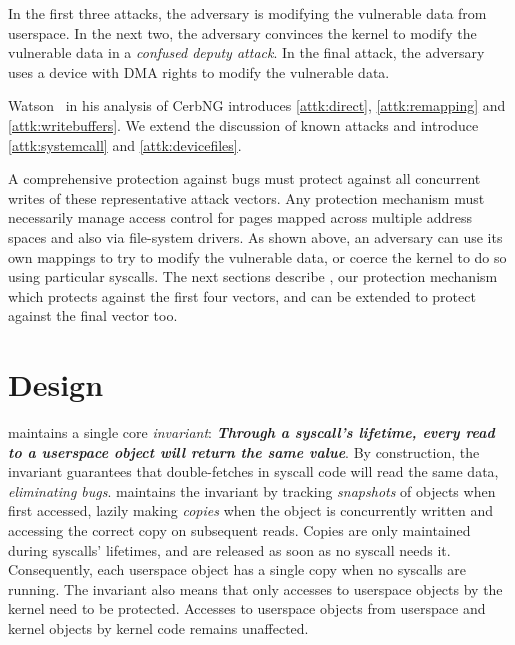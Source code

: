 \documentclass[letterpaper,twocolumn,10pt, anonymous]{article}
\begin{document}
In the first three attacks, the adversary is modifying the vulnerable data 
from userspace.
In the next two, the adversary convinces the kernel to modify the vulnerable
data in a \emph{confused deputy attack}.
In the final attack, the adversary uses a device with DMA rights to modify 
the vulnerable data.

Watson~\cite{watson2007exploiting} in his analysis of CerbNG introduces
\autoref{attk:direct}, \autoref{attk:remapping} and \autoref{attk:writebuffers}.
We extend the discussion of known attacks and introduce
\autoref{attk:systemcall} and \autoref{attk:devicefiles}.

A comprehensive protection against \tocttou bugs must protect against 
all concurrent writes of these representative attack vectors.
Any protection mechanism must necessarily manage access control for pages
mapped across multiple address spaces and also via file-system drivers.
As shown above, an adversary can use its own mappings to try to modify the
vulnerable data, or coerce the kernel to do so using particular syscalls.
The next sections describe \tiktok, our protection mechanism which 
protects against the first four vectors, and can be extended to protect 
against the final vector too.


\section{\tiktok Design} 
\label{sec:design}

\tiktok maintains a single core \emph{invariant}:
\textbf{\emph{Through a syscall's lifetime, every read to a userspace object 
will return the same value}}.
By construction, the invariant guarantees that double-fetches in syscall
code will read the same data, \emph{eliminating \tocttou bugs}.
\tiktok maintains the invariant by tracking \emph{snapshots} of objects
when first accessed, lazily making \emph{copies} when the object is concurrently 
written and accessing the correct copy on subsequent reads.
Copies are only maintained during syscalls' lifetimes, and are released as 
soon as no syscall needs it.
Consequently, each userspace object has a single copy when no syscalls are
running.
The invariant also means that only accesses to userspace objects by the kernel
need to be protected. 
Accesses to userspace objects from userspace and kernel objects by kernel 
code remains unaffected.
\end{document}
